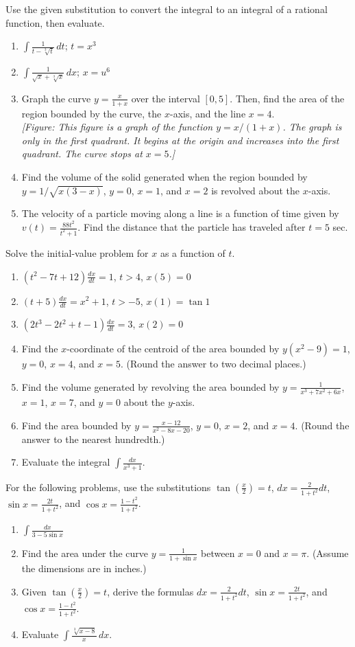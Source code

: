 \documentclass{exercises}
\begin{document}
Use the given substitution to convert the integral to an integral of a rational function, then evaluate.

\begin{enumerate}[resume]
\item $\int \frac{1}{t-\sqrt[3]{t}}\,dt$; $t=x^{3}$
\item $\int \frac{1}{\sqrt{x}+\sqrt[3]{x}}\,dx$; $x=u^{6}$
\item Graph the curve $y=\frac{x}{1+x}$ over the interval $[0,5]$. Then, find the area of the region bounded by the curve, the $x$-axis, and the line $x=4$. \\ \textit{[Figure: This figure is a graph of the function $y=x/(1+x)$. The graph is only in the first quadrant. It begins at the origin and increases into the first quadrant. The curve stops at $x=5$.]}
\item Find the volume of the solid generated when the region bounded by $y=1/\sqrt{x(3-x)}$, $y=0$, $x=1$, and $x=2$ is revolved about the $x$-axis.
\item The velocity of a particle moving along a line is a function of time given by $v(t)=\frac{88t^{2}}{t^{2}+1}$. Find the distance that the particle has traveled after $t=5$ sec.
\end{enumerate}

Solve the initial-value problem for $x$ as a function of $t$.

\begin{enumerate}[resume]
\item $(t^{2}-7t+12)\frac{dx}{dt}=1$, $t>4$, $x(5)=0$
\item $(t+5)\frac{dx}{dt}=x^{2}+1$, $t>-5$, $x(1)=\tan 1$
\item $(2t^{3}-2t^{2}+t-1)\frac{dx}{dt}=3$, $x(2)=0$
\item Find the $x$-coordinate of the centroid of the area bounded by $y(x^{2}-9)=1$, $y=0$, $x=4$, and $x=5$. (Round the answer to two decimal places.)
\item Find the volume generated by revolving the area bounded by $y=\frac{1}{x^{3}+7x^{2}+6x}$, $x=1$, $x=7$, and $y=0$ about the $y$-axis.
\item Find the area bounded by $y=\frac{x-12}{x^{2}-8x-20}$, $y=0$, $x=2$, and $x=4$. (Round the answer to the nearest hundredth.)
\item Evaluate the integral $\int \frac{dx}{x^{3}+1}$.
\end{enumerate}

For the following problems, use the substitutions $\tan(\frac{x}{2})=t$, $dx=\frac{2}{1+t^{2}}dt$, $\sin x=\frac{2t}{1+t^{2}}$, and $\cos x=\frac{1-t^{2}}{1+t^{2}}$.

\begin{enumerate}[resume]
\item $\int \frac{dx}{3-5\sin x}$
\item Find the area under the curve $y=\frac{1}{1+\sin x}$ between $x=0$ and $x=\pi$. (Assume the dimensions are in inches.)
\item Given $\tan(\frac{x}{2})=t$, derive the formulas $dx=\frac{2}{1+t^{2}}dt$, $\sin x=\frac{2t}{1+t^{2}}$, and $\cos x=\frac{1-t^{2}}{1+t^{2}}$.
\item Evaluate $\int \frac{\sqrt[3]{x-8}}{x}\,dx$.
\end{enumerate}
\end{document}
